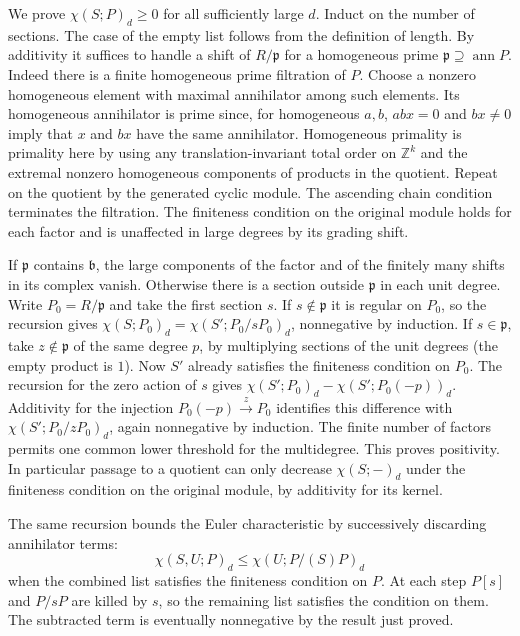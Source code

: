 We prove \(\chi(S;P)_d\ge0\) for all sufficiently large \(d\).
Induct on the number of sections. The case of the empty list follows
from the definition of length. By additivity it suffices to handle
a shift of \(R/\mathfrak p\) for a homogeneous prime
\(\mathfrak p\supseteq\operatorname{ann}P\). Indeed there is a
finite homogeneous prime filtration of \(P\). Choose a nonzero
homogeneous element with maximal annihilator among such elements.
Its homogeneous annihilator is prime since, for homogeneous
\(a,b\), \(abx=0\) and \(bx\ne0\) imply that \(x\) and \(bx\) have
the same annihilator. Homogeneous primality is primality here by
using any translation-invariant total order on \(\mathbb Z^k\) and
the extremal nonzero homogeneous components of products in the
quotient. Repeat on the quotient by the generated cyclic module. The ascending chain condition terminates the filtration. The
finiteness condition on the original module holds for each factor
and is unaffected in large degrees by its grading shift.

If \(\mathfrak p\) contains \(\mathfrak b\), the large components of
the factor and of the finitely many shifts in its complex vanish.
Otherwise there is a section outside \(\mathfrak p\) in each unit
degree. Write \(P_0=R/\mathfrak p\) and take the first section \(s\).
If \(s\notin\mathfrak p\) it is regular on \(P_0\), so the recursion
gives \(\chi(S;P_0)_d=\chi(S';P_0/sP_0)_d\), nonnegative by
induction. If \(s\in\mathfrak p\), take \(z\notin\mathfrak p\) of
the same degree \(p\), by multiplying sections of the unit degrees
(the empty product is \(1\)). Now \(S'\) already satisfies the
finiteness condition on \(P_0\). The recursion for the zero action
of \(s\) gives
\(\chi(S';P_0)_d-\chi(S';P_0(-p))_d\). Additivity for the injection
\(P_0(-p)\xrightarrow{z}P_0\) identifies this difference with
\(\chi(S';P_0/zP_0)_d\), again nonnegative by induction.
The finite number of factors permits one common lower threshold for
the multidegree. This proves positivity. In particular passage to a
quotient can only decrease \(\chi(S;-)_d\) under the finiteness
condition on the original module, by additivity for its kernel.

The same recursion bounds the Euler characteristic by successively
discarding annihilator terms:
\[
      \chi(S,U;P)_d\le\chi(U;P/(S)P)_d
\]
when the combined list satisfies the finiteness condition on \(P\).
At each step \(P[s]\) and \(P/sP\) are killed by \(s\), so the
remaining list satisfies the condition on them. The subtracted
term is eventually nonnegative by the result just proved.

